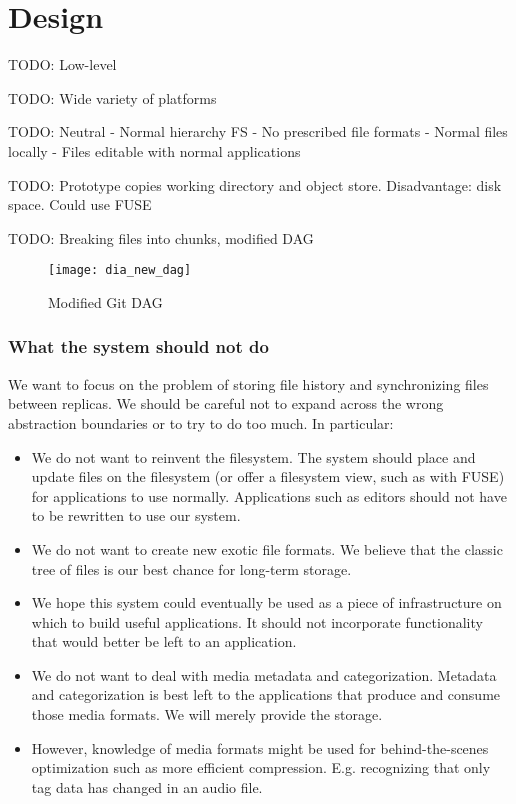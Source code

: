 \chapter{Design}

TODO: Low-level

TODO: Wide variety of platforms

TODO: Neutral
    - Normal hierarchy FS
    - No prescribed file formats
    - Normal files locally
    - Files editable with normal applications

TODO: Prototype copies working directory and object store. Disadvantage: disk
space. Could use FUSE

TODO: Breaking files into chunks, modified DAG

\begin{figure}[h!]
    \caption{Modified Git DAG}
    \label{fig:dia_new_dag}
    \centering
        \texttt{[image: dia\_new\_dag]}
\end{figure}



\subsection{What the system should not do}

We want to focus on the problem of storing file history and synchronizing files
between replicas.
We should be careful not to expand across the wrong abstraction boundaries or to
try to do too much.
In particular:

\begin{itemize}

  \item We do not want to reinvent the filesystem. The system should place and
    update files on the filesystem (or offer a filesystem view, such as with
    FUSE) for applications to use normally. Applications such as editors should
    not have to be rewritten to use our system.

  \item We do not want to create new exotic file formats. We believe that the
    classic tree of files is our best chance for long-term storage.

  \item We hope this system could eventually be used as a piece of
    infrastructure on which to build useful applications. It should not
    incorporate functionality that would better be left to an application.

  \item We do not want to deal with media metadata and categorization. Metadata
    and categorization is best left to the applications that produce and consume
    those media formats. We will merely provide the storage.

  \item However, knowledge of media formats might be used for behind-the-scenes
    optimization such as more efficient compression. E.g. recognizing that only
    tag data has changed in an audio file.

\end{itemize}
